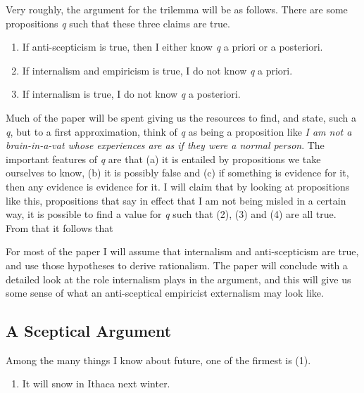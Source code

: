 \documentclass[
  11pt,
  letterpaper,
  DIV=11,
  numbers=noendperiod,
  oneside]{scrartcl}
\providecommand{\tightlist}{%
  \setlength{\itemsep}{0pt}\setlength{\parskip}{0pt}}\usepackage{longtable,booktabs,array}
\begin{document}
Very roughly, the argument for the trilemma will be as follows. There
are some propositions \emph{q} such that these three claims are true.

\begin{enumerate}
\def\labelenumi{\arabic{enumi}.}
\setcounter{enumi}{1}
\item
  If anti-scepticism is true, then I either know \emph{q} a priori or a
  posteriori.
\item
  If internalism and empiricism is true, I do not know \emph{q} a
  priori.
\item
  If internalism is true, I do not know \emph{q} a posteriori.
\end{enumerate}

Much of the paper will be spent giving us the resources to find, and
state, such a \emph{q}, but to a first approximation, think of \emph{q}
as being a proposition like \emph{I am not a brain-in-a-vat whose
experiences are as if they were a normal person}. The important features
of \emph{q} are that (a) it is entailed by propositions we take
ourselves to know, (b) it is possibly false and (c) if something is
evidence for it, then any evidence is evidence for it. I will claim that
by looking at propositions like this, propositions that say in effect
that I am not being misled in a certain way, it is possible to find a
value for \emph{q} such that (2), (3) and (4) are all true. From that it
follows that

For most of the paper I will assume that internalism and anti-scepticism
are true, and use those hypotheses to derive rationalism. The paper will
conclude with a detailed look at the role internalism plays in the
argument, and this will give us some sense of what an anti-sceptical
empiricist externalism may look like.

\subsection{A Sceptical Argument}\label{a-sceptical-argument}

Among the many things I know about future, one of the firmest is (1).

\begin{enumerate}
\def\labelenumi{\arabic{enumi}.}
\tightlist
\item
  It will snow in Ithaca next winter.
\end{enumerate}
\end{document}
